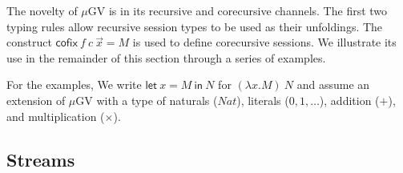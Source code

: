 \documentclass[orivec,envcountsame]{llncs}
\makeatletter
\newcommand{\lto}{\ensuremath{\multimap}}
\newcommand{\uto}{\ensuremath{\rightarrow}}
\newcommand{\mkwd}[1]{\mathsf{#1}}
\newcommand{\lrkwd}{\mkwd{cofix}}
\newcommand{\gvfix}[3]{\lrkwd\:#1\:#2 = #3}
\newcommand{\gvifthen}[3]{\mkwd{if}\:#1\:\mkwd{then}\:#2\:\mkwd{else}\:#3}
\newcommand{\key}{\mkwd}
\newcommand{\mucp}{$\mu\mathrm{CP}$\xspace}
\newcommand{\mugv}{$\mu\mathrm{GV}$\xspace}
\newcommand{\ba}{\begin{array}}
\newcommand{\ea}{\end{array}}
\newcommand{\bl}{\ba[t]{@{}l@{}}}
\newcommand{\el}{\ea}
\newcommand{\secref}[1]{Section~\ref{sec:#1}}
\makeatother
\begin{document}
The novelty of \mugv is in its recursive and corecursive channels. The first two typing rules allow
recursive session types to be used as their unfoldings.
%
The construct $\gvfix{f}{c\:\vec{x}}{M}$ is used to define corecursive sessions. We illustrate its
use in the remainder of this section through a series of examples.

%



For the examples, We write $\key{let}\:x=M\:\key{in}\:N$ for $(\lambda x.M)\:N$ and assume an
extension of \mugv with a type of naturals ($Nat$), literals ($0,1,\dots$), addition ($+$), and
multiplication ($\times$).

%

\subsection{Streams}
\end{document}
